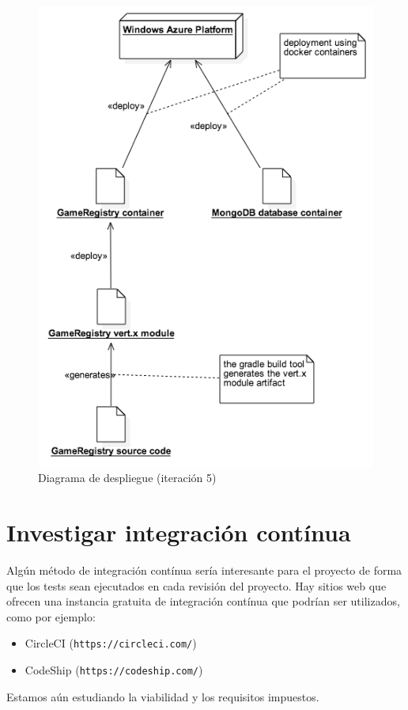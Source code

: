 \begin{figure}[h]
 \includegraphics[scale=0.6]{diagrams/docker_deployment_diagram.png}
 \caption{Diagrama de despliegue (iteración 5)}
 \label{fig:despliegue}
\end{figure} 


\section{Investigar integración contínua}
Algún método de integración contínua sería interesante para el proyecto de forma que los tests 
sean ejecutados en cada revisión del proyecto. Hay sitios web que ofrecen una instancia gratuita de
integración contínua que podrían ser utilizados, como por ejemplo:

\begin{itemize}
\item CircleCI (\texttt{https://circleci.com/})
\item CodeShip (\texttt{https://codeship.com/})
\end{itemize}

Estamos aún estudiando la viabilidad y los requisitos impuestos.